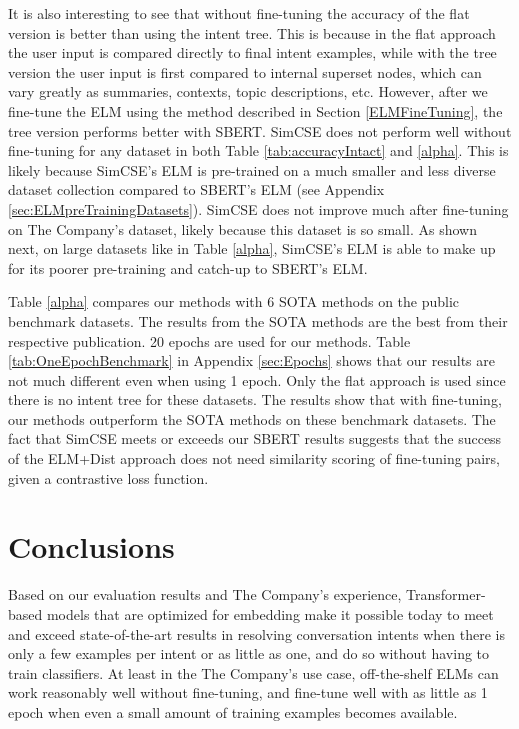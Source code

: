 \documentclass[sigconf, anonymous=true]{acmart}
\begin{document}
It is also interesting to see that without fine-tuning the accuracy of the flat version is better than using the intent tree. This is because in the flat approach the user input is compared directly to final intent examples, while with the tree version the user input is first compared to internal superset nodes, which can vary greatly as summaries, contexts, topic descriptions, etc. However, after we fine-tune the ELM using the method described in Section \ref{ELMFineTuning}, the tree version performs better with SBERT. SimCSE does not perform well without fine-tuning for any dataset in both Table \ref{tab:accuracyIntact} and \ref{alpha}. This is likely because SimCSE's ELM is pre-trained on a much smaller and less diverse dataset collection compared to SBERT's ELM (see Appendix \ref{sec:ELMpreTrainingDatasets}). SimCSE does not improve much after fine-tuning on The Company's dataset, likely because this dataset is so small. As shown next, on large datasets like in Table \ref{alpha}, SimCSE's ELM is able to make up for its poorer pre-training and catch-up to SBERT's ELM.   

Table \ref{alpha} compares our methods with 6 SOTA methods on the public benchmark datasets. The results from the SOTA methods are the best from their respective publication. 20 epochs are used for our methods. Table \ref{tab:OneEpochBenchmark} in Appendix \ref{sec:Epochs} shows that our results are not much different even when using 1 epoch. Only the flat approach is used since there is no intent tree for these datasets. The results show that with fine-tuning, our methods outperform the SOTA methods on these benchmark datasets. The fact that SimCSE meets or exceeds our SBERT results suggests that the success of the ELM+Dist approach does not need similarity scoring of fine-tuning pairs, given a contrastive loss function.  


\section{Conclusions}
Based on our evaluation results and The Company's experience, Transformer-based models that are optimized for embedding make it possible today to meet and exceed state-of-the-art results in resolving conversation intents when there is only a few examples per intent or as little as one, and do so without having to train classifiers. At least in the The Company's use case, off-the-shelf ELMs can work reasonably well without fine-tuning, and fine-tune well with as little as 1 epoch when even a small amount of training examples becomes available. 
\end{document}
